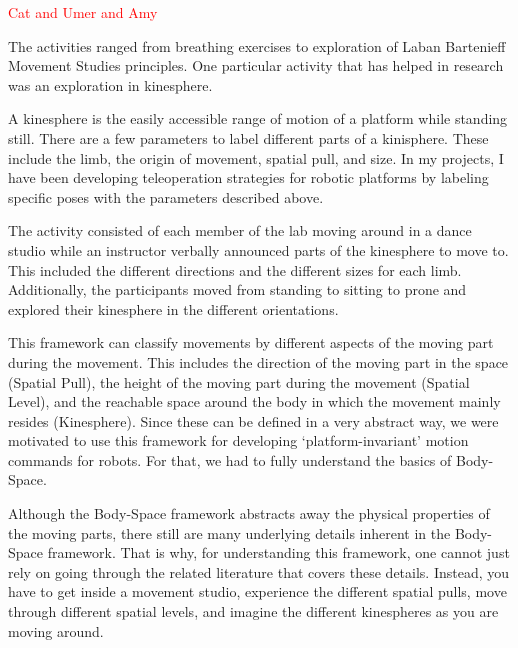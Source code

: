 \documentclass[arts,article,submit,moreauthors,pdftex,10pt,a4paper]{mdpi}
\begin{document}
\textcolor{red}{Cat and Umer and Amy}

The activities ranged from breathing exercises to exploration of Laban Bartenieff Movement Studies principles. One particular activity that has helped in research was an exploration in kinesphere. 

	A kinesphere is the easily accessible range of motion of a platform while standing still. There are a few parameters to label different parts of a kinisphere. These include the limb, the origin of movement, spatial pull, and size. In my projects, I have been developing teleoperation strategies for robotic platforms by labeling specific poses with the parameters described above.  

	The activity consisted of each member of the lab moving around in a dance studio while an instructor verbally announced parts of the kinesphere to move to.  This included the different directions and the different sizes for each limb. Additionally, the participants moved from standing to sitting to prone and explored their kinesphere in the different orientations. 
	
	This framework can classify movements by different aspects of the moving part during the movement. This includes the direction of the moving part in the space (Spatial Pull), the height of the moving part during the movement (Spatial Level), and the reachable space around the body in which the movement mainly resides (Kinesphere). Since these can be defined in a very abstract way, we were motivated to use this framework for developing ‘platform-invariant’ motion commands for robots. For that, we had to fully understand the basics of Body-Space.

Although the Body-Space framework abstracts away the physical properties of the moving parts, there still are many underlying details inherent in the Body-Space framework. That is why, for understanding this framework, one cannot just rely on going through the related literature that covers these details. Instead, you have to get inside a movement studio, experience the different spatial pulls, move through different spatial levels, and imagine the different kinespheres as you are moving around. %

\end{document}
